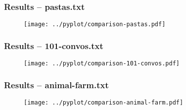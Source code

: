 \documentclass[../main.tex]{subfiles}
\begin{document}
\begin{frame}
	\frametitle{Results -- pastas.txt}
	\begin{figure}[H]
		\centering
		\texttt{[image: ../pyplot/comparison-pastas.pdf]}
	\end{figure}
\end{frame}

\begin{frame}
	\frametitle{Results -- 101-convos.txt}
	\begin{figure}[H]
		\centering
		\texttt{[image: ../pyplot/comparison-101-convos.pdf]}
	\end{figure}
\end{frame}

\begin{frame}
	\frametitle{Results -- animal-farm.txt}
	\begin{figure}[H]
		\centering
		\texttt{[image: ../pyplot/comparison-animal-farm.pdf]}
	\end{figure}
\end{frame}
\end{document}
